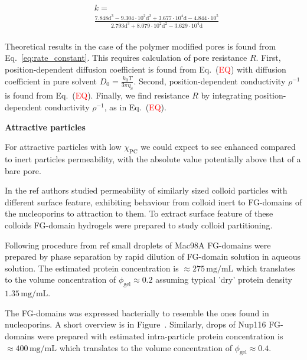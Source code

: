 \documentclass[10pt, a4paper]{article}
\newcommand\todo[1]{\textcolor{red}{#1}}
\begin{document}
\begin{multicols}{2}
\begin{eqnarray}
\begin{split}
    &k =\\
    &\frac{7.848 \mathrm{d}^{3} - 9.304 \cdot 10^{2} \mathrm{d}^{2}  + 3.677 \cdot 10^{4} \mathrm{d}- 4.844 \cdot 10^{5}}{2.793 \mathrm{d}^{3} + 8.079 \cdot 10^{2} \mathrm{d}^{2}  - 3.629 \cdot 10^{4} \mathrm{d}}
\end{split}
\end{eqnarray}

Theoretical results in the case of the polymer modified pores is found from Eq.~\ref{eq:rate_constant}.
This requires calculation of pore resistance $R$.
First, position-dependent diffusion coefficient is found from Eq.~(\todo{EQ}) with diffusion coefficient in pure solvent $D_{0} = \frac{k_{\text{B}} T}{3\pi\eta_{\text{S}}
}$.
Second, position-dependent conductivity $\rho^{-1}$ is found from Eq.~(\todo{EQ}).
Finally, we find resistance $R$ by integrating position-dependent conductivity $\rho^{-1}$, as in Eq.~(\todo{EQ}).

\textbf{Attractive particles}

For attractive particles with low $\chi_{\text{PC}}$ we could expect to see enhanced compared to inert particles permeability, with the absolute value potentially above that of a bare pore.

In the ref \cite{Frey2018} authors studied permeability of similarly sized colloid particles with different surface feature, exhibiting behaviour from colloid inert to FG-domains of the nucleoporins to attraction to them.
To extract surface feature of these colloids FG-domain hydrogels were prepared to study colloid partitioning.

Following procedure from ref \cite{Schmidt2015} small droplets of Mac98A FG-domains were prepared by phase separation by rapid dilution of FG-domain solution in aqueous solution.
The estimated protein concentration is $\approx 275 \, \text{mg}/\text{mL}$ which translates to the volume concentration of $\phi_{\text{gel}} \approx 0.2$ assuming typical 'dry' protein density $1.35 \, \text{mg}/\text{mL}$.

The FG-domains was expressed bacterially to resemble the ones found in nucleoporins. A short overview is in Figure~\label{fig:experiments_overview}.
Similarly, drops of Nup116 FG-domains were prepared with estimated intra-particle protein concentration is $\approx 400 \, \text{mg}/\text{mL}$ which translates to the volume concentration of $\phi_{\text{gel}} \approx 0.4$.


\end{multicols}
\end{document}
